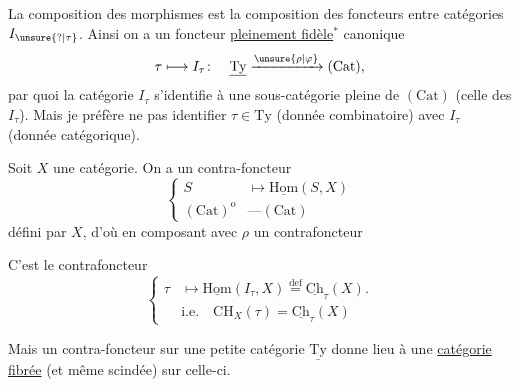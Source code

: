 
La composition des morphismes est la composition des foncteurs entre catégories $I_{\unsure{?|\tau}}$. Ainsi on a un foncteur \uline{pleinement fidèle}$^{*}$ canonique
\[ \tau\longmapsto I_\tau\colon\quad \underline{\mathrm{Ty}}\xrightarrow{\unsure{\rho|\varphi}}(\mathrm{Cat}), \]
par quoi la catégorie $I_\tau$  s'identifie à une sous-catégorie pleine de $(\mathrm{Cat})$ (celle des $I_\tau$). Mais je préfère ne pas identifier $\tau\in\mathrm{Ty}$ (donnée combinatoire) avec $I_\tau$ (donnée catégorique).

Soit $X$ une  catégorie. On a un contra-foncteur
\[ \left\{\begin{aligned} S&\longmapsto\underline{\mathrm{Hom}}(S,X)\\ (\mathrm{Cat})^{\mathrm{o}}&\mathbin{\text{---}}(\mathrm{Cat})\end{aligned}\right. \]
défini par $X$, d'où en composant avec $\rho$ un contrafoncteur

C'est le contrafoncteur
\[ \left\{\begin{aligned}
\tau&\longmapsto\underline{\mathrm{Hom}}(I_\tau,X)\overset{\mathrm{def}}{=}\underline{\mathrm{Ch}}_\tau(X).\\
&\text{i.e.}\quad \mathrm{CH}_X(\tau)=\underline{\mathrm{Ch}}_\tau(X)
\end{aligned}\right. \]

Mais un contra-foncteur sur une petite catégorie $\underline{\mathrm{Ty}}$ donne lieu à une \uline{catégorie fibrée} (et même scindée) sur celle-ci.
